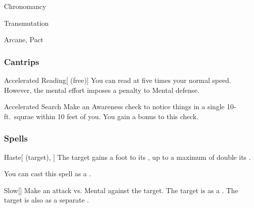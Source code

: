 \newpage
\begin{spellsection}{Chronomancy}

\begin{spellheader}
\end{spellheader}


 Transmutation

 Arcane, Pact

\subsubsection{Cantrips}


\begin{freeability}{Accelerated Reading}[ (free)]
You can read at five times your normal speed.
However, the mental effort imposes a  penalty to Mental defense.
\end{freeability}


\begin{freeability}{Accelerated Search}
Make an Awareness check to notice things in a single 10-ft.\ squrae within 10 feet of you.
You gain a  bonus to this check.
\end{freeability}

\end{spellsection}


\subsubsection{Spells}


\lowercase{\hypertarget{spell:Haste}{}}\label{spell:Haste}
\begin{attuneability}[Rank 1]{\hypertarget{spell:Haste}{Haste}}[ (target), ]
The target gains a  foot  to its , up to a maximum of double its .

You can cast this spell as a .
\end{attuneability}
\vspace{0.25em}



\lowercase{\hypertarget{spell:Slow}{}}\label{spell:Slow}
\begin{freeability}[Rank 1]{\hypertarget{spell:Slow}{Slow}}[]
Make an attack vs. Mental against the target.
\hit The target is  as a .
\crit The target is also  as a separate .
\end{freeability}
\vspace{0.25em}



